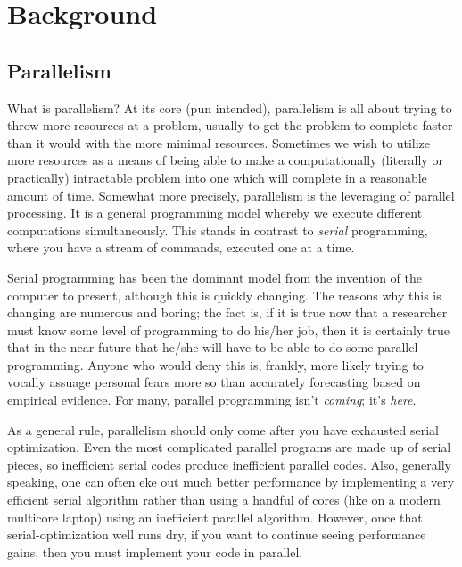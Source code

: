 \chapter{Background}
\label{sec:bg}




\section{Parallelism}
What is parallelism? At its core (pun intended), parallelism is all about
trying to throw more resources at a problem, usually to get the problem to
complete faster than it would with the more minimal resources. Sometimes
we wish to utilize more resources as a means of being able to make a
computationally (literally or practically) intractable problem into one which
will complete in a reasonable amount of time. Somewhat more precisely,
parallelism is the leveraging of parallel processing. It is a general
programming model whereby we execute different computations simultaneously.
This stands in contrast to \emph{serial} programming, where you have a stream
of commands, executed one at a time.

Serial programming has been the dominant model from the invention of the
computer to present, although this is quickly changing. The reasons why
this is changing are numerous and boring; the fact is, if it is true now
that a researcher must know some level of programming to do his/her job,
then it is certainly true that in the near future that he/she will have to
be able to do some parallel programming. Anyone who would deny this is,
frankly, more likely trying to vocally assuage personal fears more so than
accurately forecasting based on empirical evidence. For many, parallel
programming isn't \emph{coming}; it's \emph{here}.  

As a general rule, parallelism should only come after you have exhausted
serial optimization. Even the most complicated parallel programs are made
up of serial pieces, so inefficient serial codes produce inefficient parallel
codes. Also, generally speaking, one can often eke out much better performance
by implementing a very efficient serial algorithm rather than using a handful
of cores (like on a modern multicore laptop) using an inefficient parallel
algorithm. However, once that serial-optimization well runs dry, if you want
to continue seeing performance gains, then you must implement your code in
parallel.  


